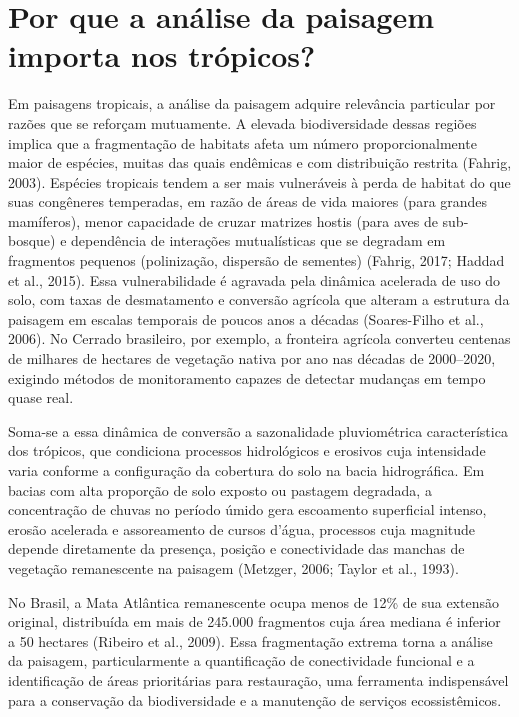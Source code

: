 \documentclass[
  portuguese,
  11pt,
  a4paper,
  open=any]{scrbook}
\begin{document}
\section{Por que a análise da paisagem importa nos
trópicos?}\label{por-que-a-anuxe1lise-da-paisagem-importa-nos-truxf3picos}

Em paisagens tropicais, a análise da paisagem adquire relevância
particular por razões que se reforçam mutuamente. A elevada
biodiversidade dessas regiões implica que a fragmentação de habitats
afeta um número proporcionalmente maior de espécies, muitas das quais
endêmicas e com distribuição restrita (Fahrig, 2003). Espécies tropicais
tendem a ser mais vulneráveis à perda de habitat do que suas congêneres
temperadas, em razão de áreas de vida maiores (para grandes mamíferos),
menor capacidade de cruzar matrizes hostis (para aves de sub-bosque) e
dependência de interações mutualísticas que se degradam em fragmentos
pequenos (polinização, dispersão de sementes) (Fahrig, 2017; Haddad et
al., 2015). Essa vulnerabilidade é agravada pela dinâmica acelerada de
uso do solo, com taxas de desmatamento e conversão agrícola que alteram
a estrutura da paisagem em escalas temporais de poucos anos a décadas
(Soares-Filho et al., 2006). No Cerrado brasileiro, por exemplo, a
fronteira agrícola converteu centenas de milhares de hectares de
vegetação nativa por ano nas décadas de 2000--2020, exigindo métodos de
monitoramento capazes de detectar mudanças em tempo quase real.

Soma-se a essa dinâmica de conversão a sazonalidade pluviométrica
característica dos trópicos, que condiciona processos hidrológicos e
erosivos cuja intensidade varia conforme a configuração da cobertura do
solo na bacia hidrográfica. Em bacias com alta proporção de solo exposto
ou pastagem degradada, a concentração de chuvas no período úmido gera
escoamento superficial intenso, erosão acelerada e assoreamento de
cursos d'água, processos cuja magnitude depende diretamente da presença,
posição e conectividade das manchas de vegetação remanescente na
paisagem (Metzger, 2006; Taylor et al., 1993).

\begin{tcolorbox}[enhanced jigsaw, colbacktitle=quarto-callout-important-color!10!white, coltitle=black, opacityback=0, breakable, left=2mm, colback=white, bottomtitle=1mm, toptitle=1mm, titlerule=0mm, arc=.35mm, opacitybacktitle=0.6, leftrule=.75mm, colframe=quarto-callout-important-color-frame, title=\textcolor{quarto-callout-important-color}{\faExclamation}\hspace{0.5em}{Paisagens tropicais e urgência analítica}, rightrule=.15mm, bottomrule=.15mm, toprule=.15mm]

No Brasil, a Mata Atlântica remanescente ocupa menos de 12\% de sua
extensão original, distribuída em mais de 245.000 fragmentos cuja área
mediana é inferior a 50 hectares (Ribeiro et al., 2009). Essa
fragmentação extrema torna a análise da paisagem, particularmente a
quantificação de conectividade funcional e a identificação de áreas
prioritárias para restauração, uma ferramenta indispensável para a
conservação da biodiversidade e a manutenção de serviços ecossistêmicos.

\end{tcolorbox}
\end{document}
